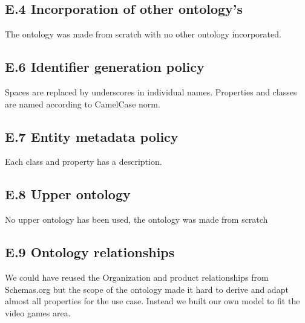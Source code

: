 \documentclass{article}
\begin{document}
\subsection*{E.4 Incorporation of other ontology's}
The ontology was made from scratch with no other ontology incorporated. 

\subsection*{E.6 Identifier generation policy}

Spaces are replaced by underscores in individual names. Properties and classes are named according to CamelCase norm. 
\subsection*{E.7 Entity metadata policy}
Each class and property has a description. 
\subsection*{E.8 Upper ontology}

No upper ontology has been used, the ontology was made from scratch
\subsection*{E.9 Ontology relationships}

We could have reused the Organization and product relationships from Schemas.org but the scope of the ontology made it hard to derive and adapt almost all properties for the use case. Instead we built our own model to fit the video games area. 
\end{document}
